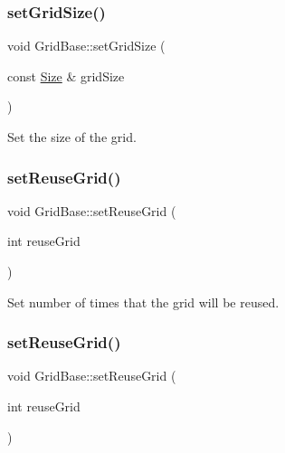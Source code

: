 \subsubsection{\texorpdfstring{set\+Grid\+Size()}{setGridSize()}\hspace{0.1cm}{\footnotesize\ttfamily [2/2]}}
{\footnotesize\ttfamily void Grid\+Base\+::set\+Grid\+Size (\begin{DoxyParamCaption}\item[{const \hyperlink{classSize}{Size} \&}]{grid\+Size }\end{DoxyParamCaption})\hspace{0.3cm}{\ttfamily [inline]}}

Set the size of the grid. \mbox{\label{classGridBase_ab87f6c1456330846fb903ab560fed507}} 
\subsubsection{\texorpdfstring{set\+Reuse\+Grid()}{setReuseGrid()}\hspace{0.1cm}{\footnotesize\ttfamily [1/2]}}
{\footnotesize\ttfamily void Grid\+Base\+::set\+Reuse\+Grid (\begin{DoxyParamCaption}\item[{int}]{reuse\+Grid }\end{DoxyParamCaption})\hspace{0.3cm}{\ttfamily [inline]}}

Set number of times that the grid will be reused. \mbox{\label{classGridBase_ab87f6c1456330846fb903ab560fed507}} 
\subsubsection{\texorpdfstring{set\+Reuse\+Grid()}{setReuseGrid()}\hspace{0.1cm}{\footnotesize\ttfamily [2/2]}}
{\footnotesize\ttfamily void Grid\+Base\+::set\+Reuse\+Grid (\begin{DoxyParamCaption}\item[{int}]{reuse\+Grid }\end{DoxyParamCaption})\hspace{0.3cm}{\ttfamily [inline]}}

